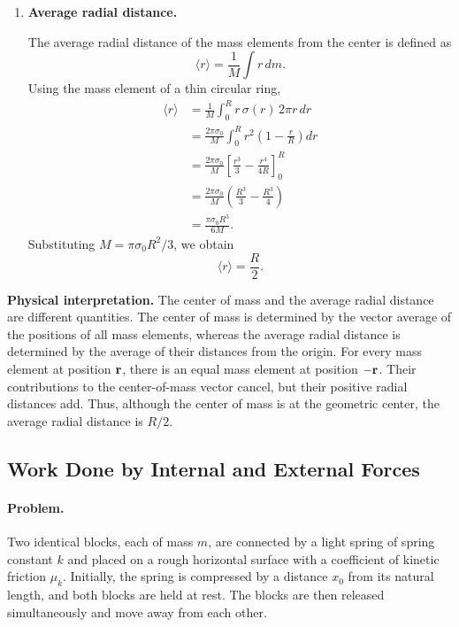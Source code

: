 \documentclass[12pt]{article}
\begin{document}
\begin{enumerate}
    \item \textbf{Average radial distance.}

    The average radial distance of the mass elements from the
    center is defined as
    \[
        \langle r\rangle=\frac{1}{M}\int r\,dm.
    \]
    Using the mass element of a thin circular ring,
    \begin{align*}
        \langle r\rangle
        &=\frac{1}{M}\int_0^R r\,\sigma(r)\,2\pi r\,dr\\
        &=\frac{2\pi\sigma_0}{M}
        \int_0^R r^2\left(1-\frac{r}{R}\right)dr\\
        &=\frac{2\pi\sigma_0}{M}
        \left[\frac{r^3}{3}-\frac{r^4}{4R}\right]_0^R\\
        &=\frac{2\pi\sigma_0}{M}
        \left(\frac{R^3}{3}-\frac{R^3}{4}\right)\\
        &=\frac{\pi\sigma_0R^3}{6M}.
    \end{align*}
    Substituting $M=\pi\sigma_0R^2/3$, we obtain
    \[
        \boxed{\langle r\rangle=\frac{R}{2}}.
    \]
\end{enumerate}

\noindent
\textbf{Physical interpretation.}
The center of mass and the average radial distance are different
quantities. The center of mass is determined by the vector average
of the positions of all mass elements, whereas the average radial
distance is determined by the average of their distances from the
origin. For every mass element at position $\vb{r}$, there is an
equal mass element at position $-\vb{r}$. Their contributions to
the center-of-mass vector cancel, but their positive radial
distances add. Thus, although the center of mass is at the
geometric center, the average radial distance is $R/2$.

\subsection{Work Done by Internal and External Forces}

\paragraph{Problem.}
Two identical blocks, each of mass $m$, are connected by a light spring of spring constant $k$ and placed on a rough horizontal surface with a coefficient of kinetic friction $\mu_k$. Initially, the spring is compressed by a distance $x_0$ from its natural length, and both blocks are held at rest. The blocks are then released simultaneously and move away from each other.
\end{document}
